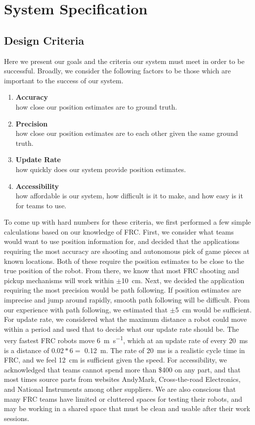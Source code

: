 \documentclass{article}
\begin{document}
\section{System Specification} \label{specs}

  \subsection{Design Criteria}

    Here we present our goals and the criteria our system must meet in order to be successful. Broadly, we consider the following factors to be those which are important to the success of our system.
    \begin{enumerate}
      \item \textbf{Accuracy}\\ how close our position estimates are to ground truth.
      \item \textbf{Precision}\\ how close our position estimates are to each other given the same ground truth.
      \item \textbf{Update Rate}\\ how quickly does our system provide position estimates.
      \item \textbf{Accessibility}\\ how affordable is our system, how difficult is it to make, and how easy is it for teams to use.
    \end{enumerate}

    To come up with hard numbers for these criteria, we first performed a few simple calculations based on our knowledge of FRC. First, we consider what teams would want to use position information for, and decided that the applications requiring the most accuracy are shooting and autonomous pick of game pieces at known locations. Both of these require the position estimates to be close to the true position of the robot. From there, we know that most FRC shooting and pickup mechanisms will work within $\pm$\SI{10}{\centi\meter}. Next, we decided the application requiring the most precision would be path following. If position estimates are imprecise and jump around rapidly, smooth path following will be difficult. From our experience with path following, we estimated that $\pm$\SI{5}{\centi\meter} would be sufficient. For update rate, we considered what the maximum distance a robot could move within a period and used that to decide what our update rate should be. The very fastest FRC robots move \SI{6}{\meter\per\second}, which at an update rate of every \SI{20}{\milli\second} is a distance of $0.02*6 =$ \SI{0.12}{\meter}. The rate of \SI{20}{\milli\second} is a realistic cycle time in FRC, and we feel \SI{12}{\centi\meter} is sufficient given the speed. For accessibility, we acknowledged that teams cannot spend more than \$400 on any part, and that most times source parts from websites AndyMark, Cross-the-road Electronics, and National Instruments among other suppliers. We are also conscious that many FRC teams have limited or cluttered spaces for testing their robots, and may be working in a shared space that must be clean and usable after their work sessions.
\end{document}
